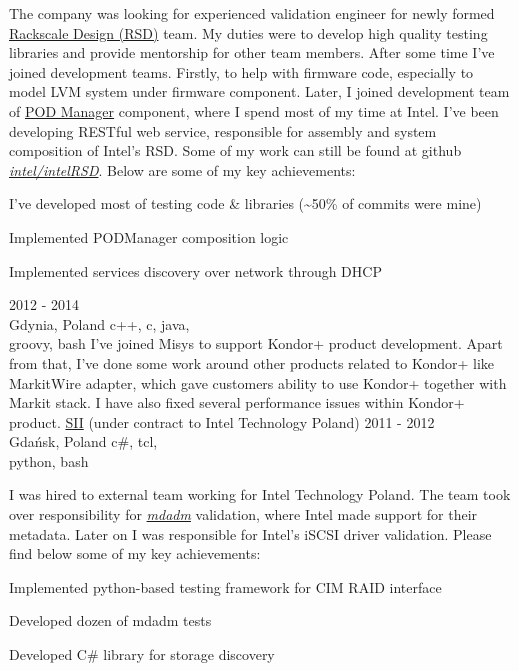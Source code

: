 \documentclass[a4paper,11pt]{cv4tw}%
\begin{document}
      {The company was looking for experienced validation engineer for newly formed \href{https://www.intel.com/intelRSD}{Rackscale Design (RSD)} team.
        My duties were to develop high quality testing libraries and provide mentorship for other team members.
        After some time I've joined development teams. Firstly, to help with firmware code, especially to model LVM system under firmware component.
        Later, I joined development team of
        \href{https://www.intel.com/content/www/us/en/architecture-and-technology/rack-scale-design/pod-manager-user-guide-v2-1.html}{POD Manager} component,
        where I spend most of my time at Intel. I've been developing RESTful web service, responsible for assembly and system composition of Intel's RSD. 
        Some of my work can still be found at github \emph{\href{https://github.com/intel/intelRSD}{intel/intelRSD}}.
        Below are some of my key achievements:
        \begin{missions}
        \item I've developed most of testing code \& libraries (\textasciitilde50\% of commits were mine)
        \item Implemented PODManager composition logic
        \item Implemented services discovery over network through DHCP
        \end{missions}
      }      
      {2012 - 2014\\Gdynia, Poland}
      {c++, c, java,\\groovy, bash}
      {I've joined Misys to support Kondor+ product development.
        Apart from that, I've done some work around other products related to Kondor+
        like MarkitWire adapter, which gave customers ability to use Kondor+ together
        with Markit stack. I have also fixed several performance issues within Kondor+ product.
      }
      {\href{https://sii.pl/en/}{SII} (under contract to Intel Technology Poland)}
      {2011 - 2012\\Gdańsk, Poland}
      {c\#, tcl,\\python, bash}
      {I was hired to external team working for Intel Technology Poland. The team
        took over responsibility for \href{https://en.wikipedia.org/wiki/Mdadm}{\emph{mdadm}}
        validation, where Intel made support for their metadata. Later on I was
        responsible for Intel's iSCSI driver validation. Please find below some
        of my key achievements:
        \begin{missions}
        \item Implemented python-based testing framework for CIM RAID interface
        \item Developed dozen of mdadm tests
        \item Developed C\# library for storage discovery
        \end{missions}
      }
\end{document}
